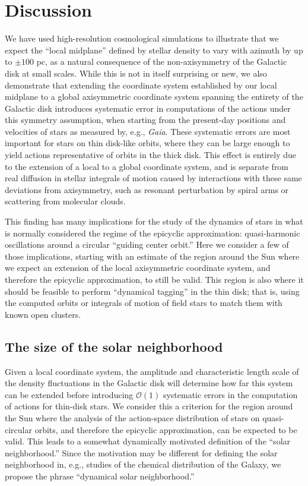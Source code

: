 \documentclass[twocolumn]{aastex62}
\begin{document}
\section{Discussion} \label{sec:discussion}
We have used high-resolution cosmological simulations to illustrate that we
expect the ``local midplane'' defined by stellar density to vary with azimuth
by up to $\pm 100$ pc, as a natural consequence of the non-axisymmetry of the
Galactic disk at small scales. While this is not in itself surprising or new,
we also demonstrate that extending the coordinate system established by our
local midplane to a global axisymmetric coordinate system spanning the
entirety of the Galactic disk introduces systematic error in computations of
the actions under this symmetry assumption, when starting from the present-day
positions and velocities of stars as measured by, e.g., \emph{Gaia}.
These systematic errors are most important for stars on thin disk-like orbits,
where they can be large enough to yield actions representative of orbits in
the thick disk. This effect is entirely due to the extension of a local to a
global coordinate system, and is separate from real diffusion in stellar
integrals of motion caused by interactions with these same deviations from
axisymmetry, such as resonant perturbation by spiral arms or scattering from
molecular clouds.

This finding has many implications for the study of the dynamics of stars in
what is normally considered the regime of the epicyclic approximation:
quasi-harmonic oscillations around a circular ``guiding center orbit.'' Here
we consider a few of those implications, starting with an estimate of the
region around the Sun where we expect an extension of the local axisymmetric
coordinate system, and therefore the epicyclic approximation, to still be
valid. This region is also where it should be feasible to perform ``dynamical
tagging'' in the thin disk; that is, using the computed orbits or integrals of
motion of field stars to match them with known open clusters.

\subsection{The size of the solar neighborhood} \label{sssec:neighborhood}
Given a local coordinate system, the amplitude and characteristic length scale
of the density fluctuations in the Galactic disk will determine how far this
system can be extended before introducing $\mathcal{O}(1)$ systematic errors
in the computation of actions for thin-disk stars. We consider this a
criterion for the region around the Sun where the analysis of the action-space
distribution of stars on quasi-circular orbits, and therefore the epicyclic
approximation, can be expected to be valid. This leads to a somewhat
dynamically motivated definition of the ``solar neighborhood.'' Since the
motivation may be different for defining the solar neighborhood in, e.g.,
studies of the chemical distribution of the Galaxy, we propose the phrase
``dynamical solar neighborhood.''
\end{document}
